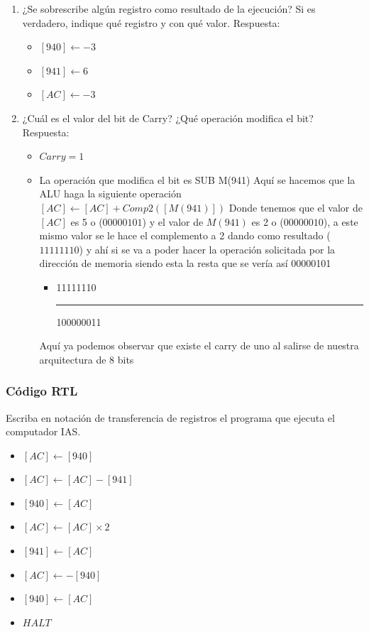 \documentclass{article}
\begin{document}
\begin{enumerate}
\item ¿Se sobrescribe algún registro como resultado de la ejecución? Si
es verdadero, indique qué registro y con qué valor.
Respuesta:
\begin{itemize}
\item \([940] \leftarrow -3\)
\item \([941] \leftarrow 6\)
\item \([AC] \leftarrow -3\)
\end{itemize}

\item ¿Cuál es el valor del bit de Carry? ¿Qué operación modifica el bit?
Respuesta:
\begin{itemize}
\item \(Carry = 1\)

\item La operación que modifica el bit es SUB M(941)
Aquí se hacemos que la ALU haga la siguiente operación \([AC]
     \leftarrow [AC] + Comp2([M(941)])\)
Donde tenemos que el valor de \([AC]\) es 5 o (\(00000101\)) y el
valor de \(M(941)\) es 2 o (\(00000010\)), a este mismo valor se le
hace el complemento a 2 dando como resultado (\(11111110\)) y ahí
si se va a poder hacer la operación solicitada por la dirección
de memoria siendo esta la resta que se vería así
  00000101
\begin{itemize}
\item 11111110

\noindent\rule{\textwidth}{0.5pt}
100000011
\end{itemize}
Aquí ya podemos observar que existe el carry de uno al salirse de
nuestra arquitectura de 8 bits
\end{itemize}
\end{enumerate}

\subsubsection{Código RTL}
\label{sec:orgadd7e78}

Escriba en notación de transferencia de registros el programa que
ejecuta el computador IAS.

\begin{itemize}
\item \([AC] \leftarrow [940]\)
\item \([AC] \leftarrow [AC] - [941]\)
\item \([940] \leftarrow [AC]\)
\item \([AC] \leftarrow [AC] \times 2\)
\item \([941] \leftarrow [AC]\)
\item \([AC] \leftarrow -[940]\)
\item \([940] \leftarrow [AC]\)
\item \(HALT\)
\end{itemize}
\end{document}
